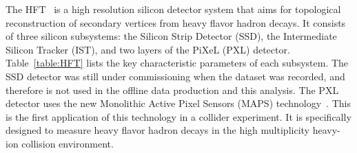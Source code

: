 \documentclass[%
 reprint,	
 amsmath,amssymb,
 aps,
 prc,
]{revtex4-1}
\begin{document}
The HFT~\cite{Contin:2017mck} is a high resolution silicon detector system that aims for topological reconstruction of secondary vertices from heavy flavor hadron decays. It consists of three silicon subsystems: the Silicon Strip Detector (SSD), the Intermediate Silicon Tracker (IST), and two layers of the PiXeL (PXL) detector. 
Table~\ref{table:HFT} lists the key characteristic parameters of each subsystem. The SSD detector was still under commissioning when the dataset was recorded, and therefore is not used in the offline data production and this analysis.
The PXL detector uses the new Monolithic Active Pixel Sensors (MAPS) technology~\cite{Contin:2017mck}. This is the first application of this technology in a collider experiment. It is specifically designed to measure heavy flavor hadron decays in the high multiplicity heavy-ion collision environment.

\begin{table}[t]
\end{table}
\end{document}
